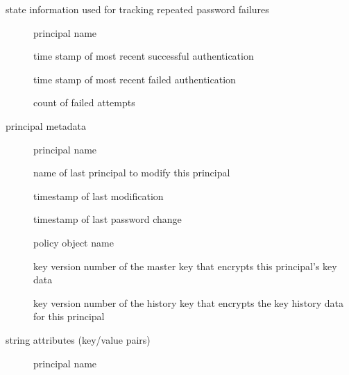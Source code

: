 \documentclass[letterpaper,10pt,english]{sphinxmanual}
\begin{document}
\begin{description}
\begin{description}
\end{description}

\item[{\sphinxstylestrong{princ\_lockout}}] \leavevmode
state information used for tracking repeated password failures
\begin{description}
\item[{}] \leavevmode
principal name

\item[{}] \leavevmode
time stamp of most recent successful authentication

\item[{}] \leavevmode
time stamp of most recent failed authentication

\item[{}] \leavevmode
count of failed attempts

\end{description}

\item[{\sphinxstylestrong{princ\_meta}}] \leavevmode
principal metadata
\begin{description}
\item[{}] \leavevmode
principal name

\item[{}] \leavevmode
name of last principal to modify this principal

\item[{}] \leavevmode
timestamp of last modification

\item[{}] \leavevmode
timestamp of last password change

\item[{}] \leavevmode
policy object name

\item[{}] \leavevmode
key version number of the master key that encrypts this
principal’s key data

\item[{}] \leavevmode
key version number of the history key that encrypts the key
history data for this principal

\end{description}

\item[{\sphinxstylestrong{princ\_stringattrs}}] \leavevmode
string attributes (key/value pairs)
\begin{description}
\item[{}] \leavevmode
principal name


\end{description}
\end{description}
\end{document}
